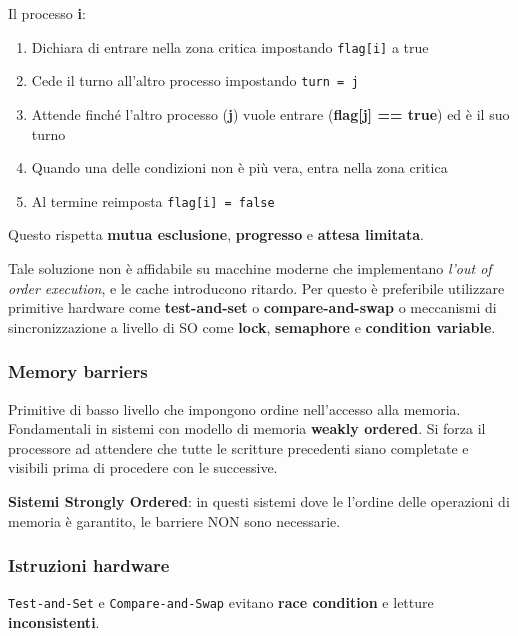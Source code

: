 Il processo \textbf{i}:

\begin{enumerate}
  \item Dichiara di entrare nella zona critica impostando \verb|flag[i]| a true
  \item Cede il turno all'altro processo impostando \verb|turn = j|
  \item Attende finché l'altro processo (\textbf{j}) vuole entrare (\textbf{flag[j] == true}) ed è il suo turno
  \item Quando una delle condizioni non è più vera, entra nella zona critica
  \item Al termine reimposta \verb|flag[i] = false|
\end{enumerate}

Questo rispetta \textbf{mutua esclusione}, \textbf{progresso} e \textbf{attesa limitata}.

Tale soluzione non è affidabile su macchine moderne che implementano \textit{l'out of order execution}, e le cache
introducono ritardo.
Per questo è preferibile utilizzare primitive hardware come \textbf{test-and-set} o \textbf{compare-and-swap} o
meccanismi di sincronizzazione a livello di SO come \textbf{lock}, \textbf{semaphore} e \textbf{condition variable}.

\subsubsection{Memory barriers}

Primitive di basso livello che impongono ordine nell'accesso alla memoria.
Fondamentali in sistemi con modello di memoria \textbf{weakly ordered}. Si forza il processore
ad attendere che tutte le scritture precedenti siano completate e visibili prima di procedere con le successive.

\begin{tcolorbox}
  \textbf{Sistemi Strongly Ordered}: in questi sistemi dove le l'ordine delle operazioni di memoria è garantito, le barriere NON sono necessarie.
\end{tcolorbox}



\subsubsection{Istruzioni hardware}

\verb|Test-and-Set| e \verb|Compare-and-Swap| evitano \textbf{race condition} e letture \textbf{inconsistenti}.

